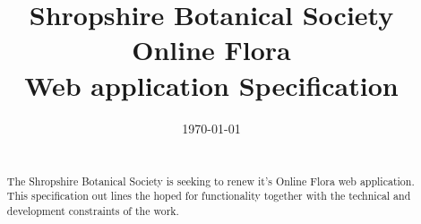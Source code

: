 \documentclass[a4paper,12pt,landscape]{article}
\title{Shropshire Botanical Society Online Flora\\
Web application Specification}
\author{\documentauthor}
\date{\today}
\begin{document}
\maketitle


\begin{abstract}
  \begin{center}
    \begin{minipage}{0.5\textwidth}
      \strut\\
      The Shropshire Botanical Society is seeking
      to renew it's Online Flora web application.
      This specification out lines the hoped for functionality
      together with the technical
      and
      development constraints of the work.
    \end{minipage}
  \end{center}
\end{abstract}

\clearpage
\begin{multicols*}{2}
  \setcounter{tocdepth}{3}
  \tableofcontents
\end{multicols*}
\clearpage
\end{document}
